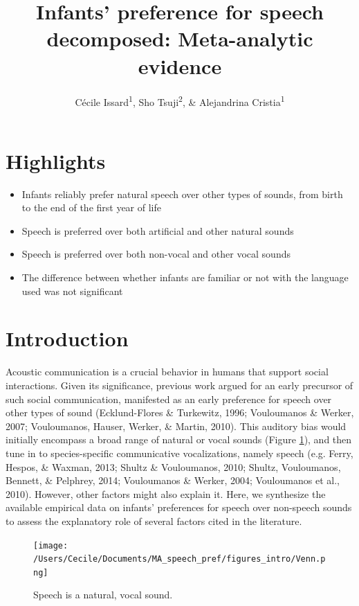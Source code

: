 \documentclass[man]{apa6}
\title{Infants' preference for speech decomposed: Meta-analytic evidence}
\author{Cécile Issard\textsuperscript{1}, Sho Tsuji\textsuperscript{2}, \&
Alejandrina Cristia\textsuperscript{1}}
\date{}
\affiliation{
\vspace{0.5cm}
\textsuperscript{1} Laboratoire de Sciences Cognitives et Psycholinguistique, Ecole Normale Supérieure, Département d'Études Cognitives\\\textsuperscript{2} International Research Center for Neurointelligence, The University of Tokyo}
\providecommand{\tightlist}{%
  \setlength{\itemsep}{0pt}\setlength{\parskip}{0pt}}
\begin{document}
\maketitle

\section{Highlights}\label{highlights}

\begin{itemize}
\tightlist
\item
  Infants reliably prefer natural speech over other types of sounds,
  from birth to the end of the first year of life
\item
  Speech is preferred over both artificial and other natural sounds
\item
  Speech is preferred over both non-vocal and other vocal sounds
\item
  The difference between whether infants are familiar or not with the
  language used was not significant
\end{itemize}

\section{Introduction}\label{introduction}

Acoustic communication is a crucial behavior in humans that support
social interactions. Given its significance, previous work argued for an
early precursor of such social communication, manifested as an early
preference for speech over other types of sound (Ecklund-Flores \&
Turkewitz, 1996; Vouloumanos \& Werker, 2007; Vouloumanos, Hauser,
Werker, \& Martin, 2010). This auditory bias would initially encompass a
broad range of natural or vocal sounds (Figure \ref{fig:venn}), and then
tune in to species-specific communicative vocalizations, namely speech
(e.g. Ferry, Hespos, \& Waxman, 2013; Shultz \& Vouloumanos, 2010;
Shultz, Vouloumanos, Bennett, \& Pelphrey, 2014; Vouloumanos \& Werker,
2004; Vouloumanos et al., 2010). However, other factors might also
explain it. Here, we synthesize the available empirical data on infants'
preferences for speech over non-speech sounds to assess the explanatory
role of several factors cited in the literature.

\begin{figure}
\centering
\texttt{[image: /Users/Cecile/Documents/MA\_speech\_pref/figures\_intro/Venn.png]}
\caption{\label{fig:venn}Speech is a natural, vocal sound.}
\end{figure}
\end{document}
